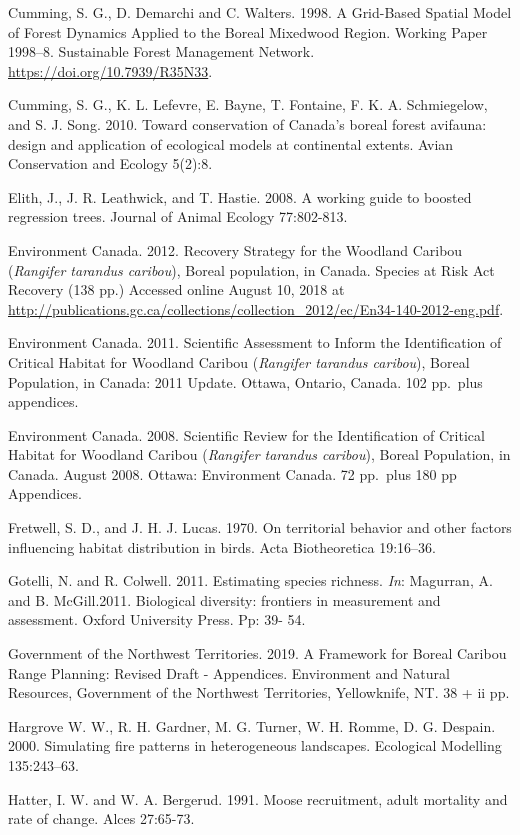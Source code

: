 \documentclass[]{article}
\begin{document}
Cumming, S. G., D. Demarchi and C. Walters. 1998. A Grid-Based Spatial
Model of Forest Dynamics Applied to the Boreal Mixedwood Region. Working
Paper 1998--8. Sustainable Forest Management Network.
\url{https://doi.org/10.7939/R35N33}.

Cumming, S. G., K. L. Lefevre, E. Bayne, T. Fontaine, F. K. A.
Schmiegelow, and S. J. Song. 2010. Toward conservation of Canada's
boreal forest avifauna: design and application of ecological models at
continental extents. Avian Conservation and Ecology 5(2):8.

Elith, J., J. R. Leathwick, and T. Hastie. 2008. A working guide to
boosted regression trees. Journal of Animal Ecology 77:802-813.

Environment Canada. 2012. Recovery Strategy for the Woodland Caribou
(\emph{Rangifer tarandus caribou}), Boreal population, in Canada.
Species at Risk Act Recovery (138 pp.) Accessed online August 10, 2018
at
\url{http://publications.gc.ca/collections/collection_2012/ec/En34-140-2012-eng.pdf}.

Environment Canada. 2011. Scientific Assessment to Inform the
Identification of Critical Habitat for Woodland Caribou (\emph{Rangifer
tarandus caribou}), Boreal Population, in Canada: 2011 Update. Ottawa,
Ontario, Canada. 102 pp.~plus appendices.

Environment Canada. 2008. Scientific Review for the Identification of
Critical Habitat for Woodland Caribou (\emph{Rangifer tarandus
caribou}), Boreal Population, in Canada. August 2008. Ottawa:
Environment Canada. 72 pp.~plus 180 pp Appendices.

Fretwell, S. D., and J. H. J. Lucas. 1970. On territorial behavior and
other factors influencing habitat distribution in birds. Acta
Biotheoretica 19:16--36.

Gotelli, N. and R. Colwell. 2011. Estimating species richness.
\emph{In}: Magurran, A. and B. McGill.2011. Biological diversity:
frontiers in measurement and assessment. Oxford University Press. Pp:
39- 54.

Government of the Northwest Territories. 2019. A Framework for Boreal
Caribou Range Planning: Revised Draft - Appendices. Environment and
Natural Resources, Government of the Northwest Territories, Yellowknife,
NT. 38 + ii pp.

Hargrove W. W., R. H. Gardner, M. G. Turner, W. H. Romme, D. G. Despain.
2000. Simulating fire patterns in heterogeneous landscapes. Ecological
Modelling 135:243--63.

Hatter, I. W. and W. A. Bergerud. 1991. Moose recruitment, adult
mortality and rate of change. Alces 27:65-73.
\end{document}
